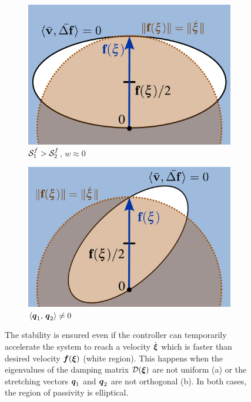 \begin{figure}[htbp]
    \centering
    \begin{subfigure}{0.49\columnwidth}
      \centerline{\includegraphics[width=\textwidth]{figures/passivity_analysis_wide}}
	  \caption{$\mathcal{S}_1^f > \mathcal{S}_2^f$, $w \approx 0$}
	  \label{fig:passivity_analysis_wide}
    \end{subfigure}\hfill%
    \begin{subfigure}{0.49\columnwidth}
    \includegraphics[width=\textwidth]{figures/passivity_analysis_skew}
	\caption{$\left\langle {\boldsymbol{q}_1}, \, {\boldsymbol{q}_2} \right\rangle \neq 0$ }
      \label{fig:passivity_analysis_skew}
    \end{subfigure}
	\caption{
		The stability is ensured even if the controller can temporarily accelerate the system  to reach a velocity $\dot{\boldsymbol{\xi}}$ which is faster than desired velocity $\boldsymbol{f}(\boldsymbol{\xi})$ (white region).
		This happens when the eigenvalues of the damping matrix $\mathcal{D}(\boldsymbol{\xi})$ are not uniform (a) or the stretching vectors $\boldsymbol{q}_1$ and $\boldsymbol{q}_2$ are not orthogonal (b). 
	In both cases, the region of passivity is elliptical.}
	\label{fig:passivity_analysis_varied}
\end{figure}



